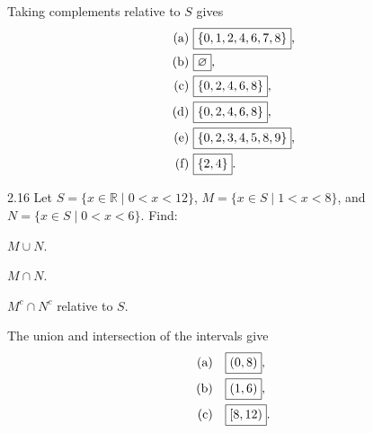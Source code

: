 \documentclass[11pt,oneside]{article}
\begin{document}
\begin{solution}
Taking complements relative to $S$ gives
\begin{align*}
\textup{(a)}&\ \boxed{\{0,1,2,4,6,7,8\}},\\
\textup{(b)}&\ \boxed{\varnothing},\\
\textup{(c)}&\ \boxed{\{0,2,4,6,8\}},\\
\textup{(d)}&\ \boxed{\{0,2,4,6,8\}},\\
\textup{(e)}&\ \boxed{\{0,2,3,4,5,8,9\}},\\
\textup{(f)}&\ \boxed{\{2,4\}}.
\end{align*}
\end{solution}

\begin{exercise}{2.16}
Let $S=\{x\in\mathbb R\mid 0<x<12\}$, $M=\{x\in S\mid1<x<8\}$, and $N=\{x\in S\mid0<x<6\}$. Find:
\begin{exercisesubparts}
\item $M\cup N$.
\item $M\cap N$.
\item $M^c\cap N^c$ relative to $S$.
\end{exercisesubparts}
\end{exercise}

\begin{solution}
The union and intersection of the intervals give
\begin{align*}
\textup{(a)}&\quad\boxed{(0,8)},\\
\textup{(b)}&\quad\boxed{(1,6)},\\
\textup{(c)}&\quad\boxed{[8,12)}.
\end{align*}
\end{solution}
\end{document}
